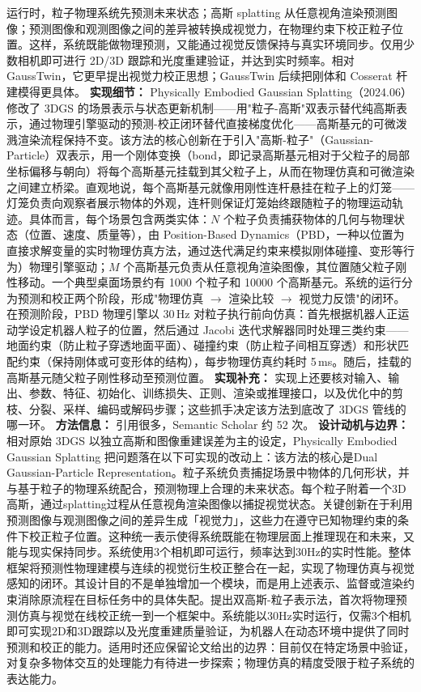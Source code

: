 运行时，粒子物理系统先预测未来状态；高斯 splatting 从任意视角渲染预测图像；预测图像和观测图像之间的差异被转换成视觉力，在物理约束下校正粒子位置。这样，系统既能做物理预测，又能通过视觉反馈保持与真实环境同步。仅用少数相机即可进行 2D/3D 跟踪和光度重建验证，并达到实时频率。相对 GaussTwin，它更早提出视觉力校正思想；GaussTwin 后续把刚体和 Cosserat 杆建模得更具体。
\textbf{实现细节：} Physically Embodied Gaussian Splatting（2024.06） 修改了 3DGS 的场景表示与状态更新机制——用"粒子-高斯"双表示替代纯高斯表示，通过物理引擎驱动的预测-校正闭环替代直接梯度优化——高斯基元的可微泼溅渲染流程保持不变。该方法的核心创新在于引入"高斯-粒子"（Gaussian-Particle）双表示，用一个刚体变换（bond，即记录高斯基元相对于父粒子的局部坐标偏移与朝向）将每个高斯基元挂载到其父粒子上，从而在物理仿真和可微渲染之间建立桥梁。直观地说，每个高斯基元就像用刚性连杆悬挂在粒子上的灯笼——灯笼负责向观察者展示物体的外观，连杆则保证灯笼始终跟随粒子的物理运动轨迹。具体而言，每个场景包含两类实体：$N$ 个粒子负责捕获物体的几何与物理状态（位置、速度、质量等），由 Position-Based Dynamics（PBD，一种以位置为直接求解变量的实时物理仿真方法，通过迭代满足约束来模拟刚体碰撞、变形等行为）物理引擎驱动；$M$ 个高斯基元负责从任意视角渲染图像，其位置随父粒子刚性移动。一个典型桌面场景约有 1000 个粒子和 10000 个高斯基元。系统的运行分为预测和校正两个阶段，形成"物理仿真 $\to$ 渲染比较 $\to$ 视觉力反馈"的闭环。在预测阶段，PBD 物理引擎以 30\,Hz 对粒子执行前向仿真：首先根据机器人正运动学设定机器人粒子的位置，然后通过 Jacobi 迭代求解器同时处理三类约束——地面约束（防止粒子穿透地面平面）、碰撞约束（防止粒子间相互穿透）和形状匹配约束（保持刚体或可变形体的结构），每步物理仿真约耗时 5\,ms。随后，挂载的高斯基元随父粒子刚性移动至预测位置。
\textbf{实现补充：} 实现上还要核对输入、输出、参数、特征、初始化、训练损失、正则、渲染或推理接口，以及优化中的剪枝、分裂、采样、编码或解码步骤；这些抓手决定该方法到底改了 3DGS 管线的哪一环。
\textbf{方法信息：} 引用很多，Semantic Scholar 约 52 次。
\textbf{设计动机与边界：} 相对原始 3DGS 以独立高斯和图像重建误差为主的设定，Physically Embodied Gaussian Splatting 把问题落在以下可实现的改动上：该方法的核心是Dual Gaussian-Particle Representation。粒子系统负责捕捉场景中物体的几何形状，并与基于粒子的物理系统配合，预测物理上合理的未来状态。每个粒子附着一个3D高斯，通过splatting过程从任意视角渲染图像以捕捉视觉状态。关键创新在于利用预测图像与观测图像之间的差异生成「视觉力」，这些力在遵守已知物理约束的条件下校正粒子位置。这种统一表示使得系统既能在物理层面上推理现在和未来，又能与现实保持同步。系统使用3个相机即可运行，频率达到30Hz的实时性能。整体框架将预测性物理建模与连续的视觉衍生校正整合在一起，实现了物理仿真与视觉感知的闭环。其设计目的不是单独增加一个模块，而是用上述表示、监督或渲染约束消除原流程在目标任务中的具体失配。提出双高斯-粒子表示法，首次将物理预测仿真与视觉在线校正统一到一个框架中。系统能以30Hz实时运行，仅需3个相机即可实现2D和3D跟踪以及光度重建质量验证，为机器人在动态环境中提供了同时预测和校正的能力。适用时还应保留论文给出的边界：目前仅在特定场景中验证，对复杂多物体交互的处理能力有待进一步探索；物理仿真的精度受限于粒子系统的表达能力。
